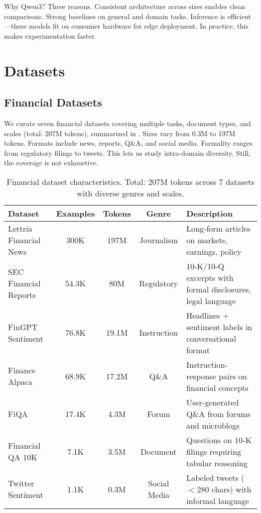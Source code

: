 Why Qwen3? Three reasons. Consistent architecture across sizes enables clean comparisons. Strong baselines on general and domain tasks. Inference is efficient—these models fit on consumer hardware for edge deployment. In practice, this makes experimentation faster.

\section{Datasets}

\subsection{Financial Datasets}

We curate seven financial datasets covering multiple tasks, document types, and scales (total: 207M tokens), summarized in . Sizes vary from 0.3M to 197M tokens. Formats include news, reports, Q\&A, and social media. Formality ranges from regulatory filings to tweets. This lets us study intra-domain diversity. Still, the coverage is not exhaustive.

\begin{table}[h]
\centering
\caption[Financial Dataset Characteristics]{Financial dataset characteristics. Total: 207M tokens across 7 datasets with diverse genres and scales.}
\label{tab:financial_datasets}
\small
\begin{tabular}{p{3cm}cccp{5.5cm}}
\toprule
\textbf{Dataset} & \textbf{Examples} & \textbf{Tokens} & \textbf{Genre} & \textbf{Description} \\
\midrule
Lettria Financial News & 300K & 197M & Journalism & Long-form articles on markets, earnings, policy \\
\midrule
SEC Financial Reports & 54.3K & 80M & Regulatory & 10-K/10-Q excerpts with formal disclosures, legal language \\
\midrule
FinGPT Sentiment & 76.8K & 19.1M & Instruction & Headlines + sentiment labels in conversational format \\
\midrule
Finance Alpaca & 68.9K & 17.2M & Q\&A & Instruction-response pairs on financial concepts \\
\midrule
FiQA & 17.4K & 4.3M & Forum & User-generated Q\&A from forums and microblogs \\
\midrule
Financial QA 10K & 7.1K & 3.5M & Document & Questions on 10-K filings requiring tabular reasoning \\
\midrule
Twitter Sentiment & 1.1K & 0.3M & Social Media & Labeled tweets ($<$280 chars) with informal language \\
\bottomrule
\end{tabular}
\end{table}

